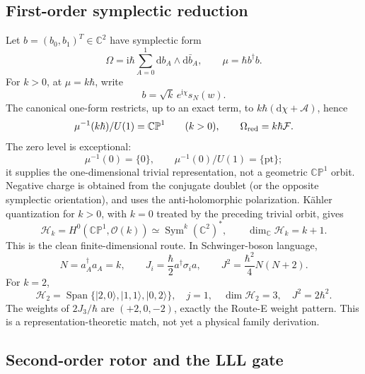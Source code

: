 \documentclass[11pt]{article}
\numberwithin{equation}{section}
\newcommand{\CP}{\mathbb{CP}}
\newcommand{\CC}{\mathbb C}
\newcommand{\cO}{\mathcal O}
\newcommand{\cH}{\mathcal H}
\newcommand{\dd}{\mathrm d}
\newcommand{\ii}{\mathrm i}
\newcommand{\Sym}{\operatorname{Sym}}
\newcommand{\Span}{\operatorname{Span}}
\begin{document}
\subsection{First-order symplectic reduction}

Let \(b=(b_0,b_1)^T\in\CC^2\) have symplectic form
\begin{equation}
 \Omega=\ii\hbar\sum_{A=0}^1\dd b_A\wedge\dd\bar b_A,
 \qquad \mu=\hbar b^\dagger b.
 \label{eq:symplecticC2}
\end{equation}
For \(k>0\), at \(\mu=k\hbar\), write
\begin{equation}
 b=\sqrt{k}\,e^{\ii\chi}s_N(w).
\end{equation}
The canonical one-form restricts, up to an exact term, to
\(k\hbar(\dd\chi+\mathcal A)\), hence
\begin{equation}
 \mu^{-1}(k\hbar)/U(1)=\CP^1\qquad(k>0),
 \qquad
 \Omega_{\rm red}=k\hbar\mathcal F.
 \label{eq:MWreduction}
\end{equation}
The zero level is exceptional:
\begin{equation}
 \mu^{-1}(0)=\{0\},\qquad \mu^{-1}(0)/U(1)=\{\mathrm{pt}\};
\end{equation}
it supplies the one-dimensional trivial representation, not a geometric
\(\CP^1\) orbit.  Negative charge is obtained from the conjugate doublet (or
the opposite symplectic orientation), and uses the anti-holomorphic
polarization.  K\"ahler quantization for \(k>0\), with \(k=0\) treated by the
preceding trivial orbit, gives
\begin{equation}
 \cH_k=H^0(\CP^1,\cO(k))
 \simeq\Sym^k(\CC^2)^*,
 \qquad \dim_\CC\cH_k=k+1.
 \label{eq:borelweil}
\end{equation}
This is the clean finite-dimensional route.  In Schwinger-boson language,
\begin{equation}
 N=a_A^\dagger a_A=k,
 \qquad J_i=\frac\hbar2a^\dagger\sigma_i a,
 \qquad J^2=\frac{\hbar^2}{4}N(N+2).
 \label{eq:schwinger}
\end{equation}
For \(k=2\),
\begin{equation}
 \cH_2=\Span\{|2,0\rangle,|1,1\rangle,|0,2\rangle\},
 \quad j=1,\quad \dim\cH_2=3,\quad J^2=2\hbar^2.
 \label{eq:k2triplet}
\end{equation}
The weights of \(2J_3/\hbar\) are \((+2,0,-2)\), exactly the Route-E
weight pattern.  This is a representation-theoretic match, not yet a physical
family derivation.

\subsection{Second-order rotor and the LLL gate}
\end{document}
